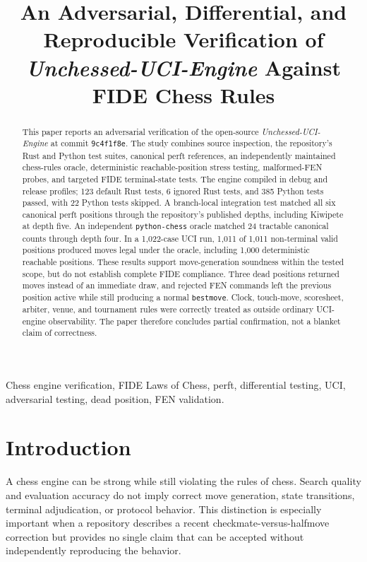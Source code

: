 \documentclass[conference]{IEEEtran}
\title{An Adversarial, Differential, and Reproducible Verification of \textit{Unchessed-UCI-Engine} Against FIDE Chess Rules}
\author{\IEEEauthorblockN{Manus AI}
\IEEEauthorblockA{Independent Verification Report\\
September 2026\\
Audited commit: \texttt{9c4f1f8e82dca8e4c729f275e8c15cb0e87e7b74}}}
\begin{document}
\maketitle

\begin{abstract}
This paper reports an adversarial verification of the open-source \textit{Unchessed-UCI-Engine} at commit \texttt{9c4f1f8e}. The study combines source inspection, the repository's Rust and Python test suites, canonical perft references, an independently maintained chess-rules oracle, deterministic reachable-position stress testing, malformed-FEN probes, and targeted FIDE terminal-state tests. The engine compiled in debug and release profiles; 123 default Rust tests, 6 ignored Rust tests, and 385 Python tests passed, with 22 Python tests skipped. A branch-local integration test matched all six canonical perft positions through the repository's published depths, including Kiwipete at depth five. An independent \texttt{python-chess} oracle matched 24 tractable canonical counts through depth four. In a 1,022-case UCI run, 1,011 of 1,011 non-terminal valid positions produced moves legal under the oracle, including 1,000 deterministic reachable positions. These results support move-generation soundness within the tested scope, but do not establish complete FIDE compliance. Three dead positions returned moves instead of an immediate draw, and rejected FEN commands left the previous position active while still producing a normal \texttt{bestmove}. Clock, touch-move, scoresheet, arbiter, venue, and tournament rules were correctly treated as outside ordinary UCI-engine observability. The paper therefore concludes partial confirmation, not a blanket claim of correctness.
\end{abstract}

\begin{IEEEkeywords}
Chess engine verification, FIDE Laws of Chess, perft, differential testing, UCI, adversarial testing, dead position, FEN validation.
\end{IEEEkeywords}

\section{Introduction}
A chess engine can be strong while still violating the rules of chess. Search quality and evaluation accuracy do not imply correct move generation, state transitions, terminal adjudication, or protocol behavior. This distinction is especially important when a repository describes a recent checkmate-versus-halfmove correction but provides no single claim that can be accepted without independently reproducing the behavior.
\end{document}
